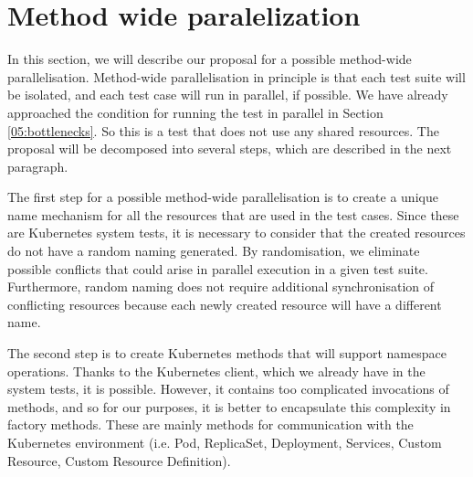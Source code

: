 \section{Method wide paralelization}
\label{04:methodwideparalelisation}

In this section, we will describe our proposal for a possible method-wide parallelisation. Method-wide parallelisation in principle is that each test suite will be isolated, and each test case will run in parallel, if possible. We have already approached the condition for running the test in parallel in Section \ref{05:bottlenecks}. So this is a test that does not use any shared resources. The proposal will be decomposed into several steps, which are described in the next paragraph.

The first step for a possible method-wide parallelisation is to create a unique name mechanism for all the resources that are used in the test cases. Since these are Kubernetes system tests, it is necessary to consider that the created resources do not have a random naming generated. By randomisation, we eliminate possible conflicts that could arise in parallel execution in a given test suite. Furthermore, random naming does not require additional synchronisation of conflicting resources because each newly created resource will have a different name.

The second step is to create Kubernetes methods that will support namespace operations. Thanks to the Kubernetes client, which we already have in the system tests, it is possible. However, it contains too complicated invocations of methods, and so for our purposes, it is better to encapsulate this complexity in factory methods. These are mainly methods for communication with the Kubernetes environment (i.e. Pod, ReplicaSet, Deployment, Services, Custom Resource, Custom Resource Definition).

